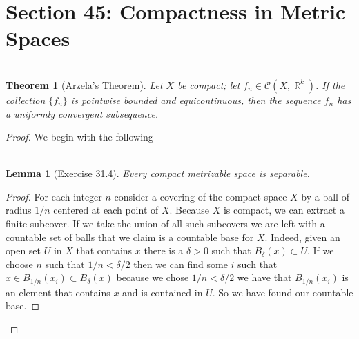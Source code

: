 \documentclass{article}
\DeclareMathOperator{\R}{\mathbb{R}}
\newcommand{\exercise}[1]{\noindent{\textbf{Exercise #1:}}}
\newtheorem*{thm}{\\ Theorem}
\newtheorem*{lem}{\\ Lemma}
\begin{document}
\section{Section 45: Compactness in Metric Spaces}
\exercise{45.3}
\begin{thm}[Arzela's Theorem]
  Let $X$ be compact; let $f_n \in \mathcal{C}(X, \R^k)$. If the
  collection $\{f_n\}$ is pointwise bounded and equicontinuous, then
  the sequence $f_n$ has a uniformly convergent subsequence.
\end{thm}
\begin{proof}
  We begin with the following
  \begin{lem}[Exercise 31.4]
    Every compact metrizable space is separable.
  \end{lem}
  \begin{proof}
    For each integer $n$ consider a covering of the compact space $X$
    by a ball of radius $1/n$ centered at each point of $X$. Because
    $X$ is compact, we can extract a finite subcover. If we take the
    union of all such subcovers we are left with a countable set of
    balls that we claim is a countable base for $X$. Indeed, given an
    open set $U$ in $X$ that contains $x$ there is a $\delta > 0$ such
    that $B_\delta(x) \subset U$. If we choose $n$ such that $1/n <
    \delta/2$ then we can find some $i$ such that $x \in B_{1/n}(x_i)
    \subset B_\delta(x)$ because we chose $1/n < \delta/2$ we have
    that $B_{1/n}(x_i)$ is an element that contains $x$ and is
    contained in $U$. So we have found our countable base.


\end{proof}
\end{proof}
\end{document}
